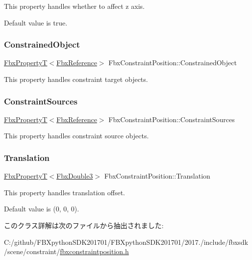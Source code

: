 This property handles whether to affect z axis.

Default value is true. \mbox{\label{class_fbx_constraint_position_a5b6779be7ae7e754c31aac3552990df3}} 
\subsubsection{\texorpdfstring{Constrained\+Object}{ConstrainedObject}}
{\footnotesize\ttfamily \hyperlink{class_fbx_property_t}{Fbx\+PropertyT}$<$\hyperlink{fbxtypes_8h_a44df6a2eec915cf27cd481e5c5e48a24}{Fbx\+Reference}$>$ Fbx\+Constraint\+Position\+::\+Constrained\+Object}

This property handles constraint target objects. \mbox{\label{class_fbx_constraint_position_a52d5190a6c10807e4f52383d05ceae38}} 
\subsubsection{\texorpdfstring{Constraint\+Sources}{ConstraintSources}}
{\footnotesize\ttfamily \hyperlink{class_fbx_property_t}{Fbx\+PropertyT}$<$\hyperlink{fbxtypes_8h_a44df6a2eec915cf27cd481e5c5e48a24}{Fbx\+Reference}$>$ Fbx\+Constraint\+Position\+::\+Constraint\+Sources}

This property handles constraint source objects. \mbox{\label{class_fbx_constraint_position_a90906bf60f276cd04cb1afebce8b9816}} 
\subsubsection{\texorpdfstring{Translation}{Translation}}
{\footnotesize\ttfamily \hyperlink{class_fbx_property_t}{Fbx\+PropertyT}$<$\hyperlink{fbxtypes_8h_ae0a96f14cde566774c7553aa7523b7a7}{Fbx\+Double3}$>$ Fbx\+Constraint\+Position\+::\+Translation}

This property handles translation offset.

Default value is (0, 0, 0). 

このクラス詳解は次のファイルから抽出されました\+:\begin{DoxyCompactItemize}
\item 
C\+:/github/\+F\+B\+Xpython\+S\+D\+K201701/\+F\+B\+Xpython\+S\+D\+K201701/2017./include/fbxsdk/scene/constraint/\hyperlink{fbxconstraintposition_8h}{fbxconstraintposition.\+h}\end{DoxyCompactItemize}
